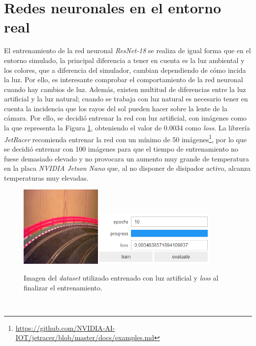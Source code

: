 \section{Redes neuronales en el entorno real}
El entrenamiento de la red neuronal \textit{ResNet-18} se realiza de igual forma que en el entorno simulado, la principal diferencia a tener en cuenta es la luz ambiental y los colores, que a diferencia del simulador, cambian dependiendo de cómo incida la luz. Por ello, es interesante comprobar el comportamiento de la red neuronal cuando hay cambios de luz. Además, existen multitud de diferencias entre la luz artificial y la luz natural; cuando se trabaja con luz natural es necesario tener en cuenta la incidencia que los rayos del sol pueden hacer sobre la lente de la cámara. Por ello, se decidió entrenar la red con luz artificial, con imágenes como la que representa la Figura \ref{fig:imagedataset}, obteniendo el valor de 0.0034 como \textit{loss}. La librería \textit{JetRacer} recomienda entrenar la red con un mínimo de 50 imágenes\footnote{\url{https://github.com/NVIDIA-AI-IOT/jetracer/blob/master/docs/examples.md}}, por lo que se decidió entrenar con 100 imágenes para que el tiempo de entrenamiento no fuese demasiado elevado y no provocara un aumento muy grande de temperatura en la placa \textit{NVIDIA Jetson Nano} que, al no disponer de disipador activo, alcanza temperaturas muy elevadas.\\

\begin{figure} [h!]
	\begin{center}
		\includegraphics[width=4cm]{figs/imagedataset}\hspace{1cm}\includegraphics[width=6cm]{figs/epoch}
	\end{center}
	\caption{Imagen del \textit{dataset} utilizado entrenado con luz artificial y \textit{loss} al finalizar el entrenamiento.}
	\label{fig:imagedataset}
\end{figure}\


